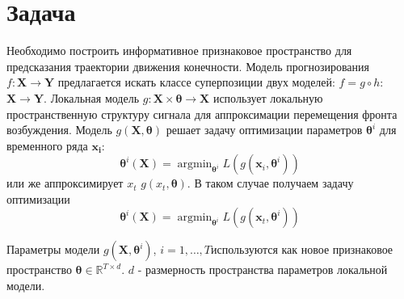 \documentclass{mipt-thesis-bs}
\newcommand{\argmin}{\mathop{\mathrm{argmin}}}
\begin{document}
\section{Задача}
Необходимо построить информативное признаковое пространство для предсказания траектории движения конечности. Модель прогнозирования $f:\mathbf{X}\to\mathbf{Y}$ предлагается искать классе суперпозиции двух моделей: $f = g \circ h:$ $\mathbf{X}\to\mathbf{Y}$. Локальная модель $g:\mathbf{X}\times\mathbf{\theta}\to\mathbf{X}$ использует локальную пространственную структуру сигнала для аппроксимации перемещения фронта возбуждения.
Модель $g(\mathbf{X}, \mathbf{\theta})$ решает задачу оптимизации параметров $\mathbf{\theta}^{i}$ для временного ряда $\mathbf{x_{i}}$:
\begin{equation}
\mathbf{\theta}^i(\mathbf{X}) = \argmin_{\mathbf{\theta}^i} L(g(\mathbf{x}_i, \mathbf{\theta}^i))
\end{equation}
или же аппроксимирует $x_t$ $g(x_t, \mathbf{\theta})$. В таком случае получаем задачу оптимизации 
\begin{equation}
\mathbf{\theta}^i(\mathbf{X}) = \argmin_{\mathbf{\theta}^i} L(g(\mathbf{x}_t, \mathbf{\theta}^i))
\end{equation}

Параметры модели $g(\mathbf{X}, \mathbf{\theta}^i)$, $i = 1,\dots,T$используются как новое признаковое пространство $\mathbf{\theta}\in\mathbb{R}^{T\times d}$. $d$ - размерность пространства параметров локальной модели.
\end{document}
